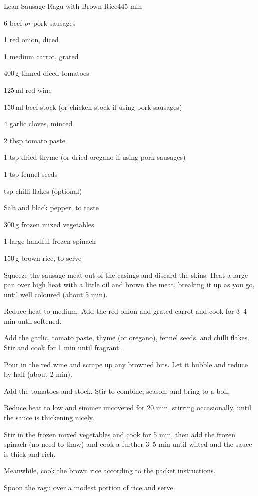 \begin{recipebox}{Lean Sausage Ragu with Brown Rice}{4}{45 min}

\begin{ingredients}
  \item 6 beef \textit{or} pork sausages
  \item 1 red onion, diced
  \item 1 medium carrot, grated
  \item 400\,g tinned diced tomatoes
  \item 125\,ml red wine
  \item 150\,ml beef stock (or chicken stock if using pork sausages)
  \item 4 garlic cloves, minced
  \item 2 tbsp tomato paste
  \item 1 tsp dried thyme (or dried oregano if using pork sausages)
  \item 1 tsp fennel seeds
  \item {} tsp chilli flakes (optional)
  \item Salt and black pepper, to taste
  \item 300\,g frozen mixed vegetables
  \item 1 large handful frozen spinach
  \item 150\,g brown rice, to serve
\end{ingredients}

\begin{method}
  \item Squeeze the sausage meat out of the casings and discard the skins. Heat a large pan over high heat with a little oil and brown the meat, breaking it up as you go, until well coloured (about 5 min).
  \item Reduce heat to medium. Add the red onion and grated carrot and cook for 3--4 min until softened.
  \item Add the garlic, tomato paste, thyme (or oregano), fennel seeds, and chilli flakes. Stir and cook for 1 min until fragrant.
  \item Pour in the red wine and scrape up any browned bits. Let it bubble and reduce by half (about 2 min).
  \item Add the tomatoes and stock. Stir to combine, season, and bring to a boil.
  \item Reduce heat to low and simmer uncovered for 20 min, stirring occasionally, until the sauce is thickening nicely.
  \item Stir in the frozen mixed vegetables and cook for 5 min, then add the frozen spinach (no need to thaw) and cook a further 3--5 min until wilted and the sauce is thick and rich.
  \item Meanwhile, cook the brown rice according to the packet instructions.
  \item Spoon the ragu over a modest portion of rice and serve.
\end{method}


\end{recipebox}
